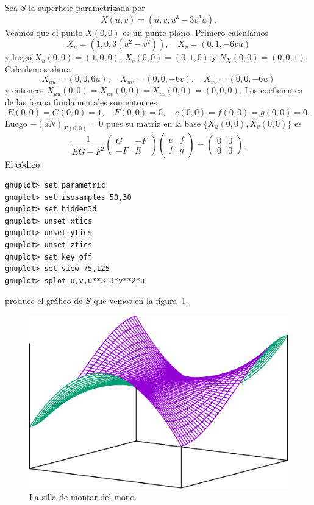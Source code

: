 \begin{example}
	Sea $S$ la superficie parametrizada por
	\[
		X(u,v)=(u,v,u^3-3v^2u).
	\]
	Veamos que el punto $X(0,0)$ es un punto plano. Primero calculamos
	\[
		X_u=(1,0,3(u^2-v^2)),\quad X_v=(0,1,-6vu)
	\]
	y luego $X_u(0,0)=(1,0,0)$, $X_v(0,0)=(0,1,0)$ y $N_X(0,0)=(0,0,1)$. Calculemos ahora
	\[
		X_{uu}=(0,0,6u),\quad
		X_{uv}=(0,0,-6v),\quad
		X_{vv}=(0,0,-6u)
	\]
	y entonces $X_{uu}(0,0)=X_{uv}(0,0)=X_{vv}(0,0)=(0,0,0)$. Los coeficientes
	de las forma fundamentales son entonces
	\[
		E(0,0)=G(0,0)=1,\quad
		F(0,0)=0,\quad
		e(0,0)=f(0,0)=g(0,0)=0.
	\]
	Luego $-(dN)_{X(0,0)}=0$ pues su matriz en la base $\{X_u(0,0),X_v(0,0)\}$ es 
	\[
		\frac{1}{EG-F^2}\begin{pmatrix}
			G & -F\\
			-F & E
		\end{pmatrix}
		\begin{pmatrix}
			e & f\\
			f & g
		\end{pmatrix}
		=\begin{pmatrix}
			0 & 0\\
			0 & 0
		\end{pmatrix}.
	\]
	El código 
\begin{lstlisting}
gnuplot> set parametric
gnuplot> set isosamples 50,30
gnuplot> set hidden3d
gnuplot> unset xtics
gnuplot> unset ytics
gnuplot> unset ztics
gnuplot> set key off
gnuplot> set view 75,125
gnuplot> splot u,v,u**3-3*v**2*u
\end{lstlisting}
produce el gráfico de $S$ que vemos en la figura~\ref{fig:monkey}. 
\begin{figure}
		\centering
    	\includegraphics[scale=0.3]{eps/monkey}
		\caption{La silla de montar del mono.}
		\label{fig:monkey}
\end{figure}
\end{example}

